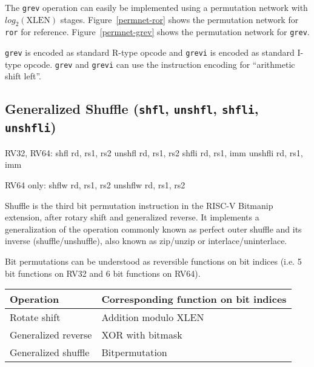 The {\tt grev} operation can easily be implemented using a permutation
network with $log_2(\textrm{XLEN})$ stages. Figure~\ref{permnet-ror}
shows the permutation network for {\tt ror} for reference.
Figure~\ref{permnet-grev} shows the permutation network for {\tt grev}.

\texttt{grev} is encoded as standard R-type opcode and \texttt{grevi} is
encoded as standard I-type opcode. \texttt{grev} and \texttt{grevi} can
use the instruction encoding for ``arithmetic shift left''.

%
%
%


\subsection{Generalized Shuffle (\texttt{shfl}, \texttt{unshfl}, \texttt{shfli}, \texttt{unshfli})}
\label{gzip}

\begin{rvb}
  RV32, RV64:
    shfl    rd, rs1, rs2
    unshfl  rd, rs1, rs2
    shfli   rd, rs1, imm
    unshfli rd, rs1, imm

  RV64 only:
    shflw    rd, rs1, rs2
    unshflw  rd, rs1, rs2
\end{rvb}

Shuffle is the third bit permutation instruction in the RISC-V Bitmanip
extension, after rotary shift and generalized reverse. It implements a
generalization of the operation commonly known as perfect outer shuffle and its
inverse (shuffle/unshuffle), also known as zip/unzip or interlace/uninterlace.

Bit permutations can be understood as reversible functions on bit indices (i.e.
5 bit functions on RV32 and 6 bit functions on RV64).

\begin{center}
\begin{tabular}{l l}
Operation & Corresponding function on bit indices \\
\hline
Rotate shift & Addition modulo {\rm XLEN} \\
Generalized reverse & XOR with bitmask \\
Generalized shuffle & Bitpermutation \\
\end{tabular}
\end{center}

